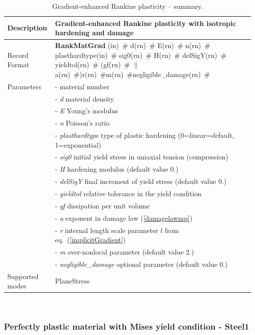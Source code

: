 \documentclass[a4paper]{article}
\newcommand{\descitem}[1]{{\noindent \bf #1}}
\newcommand{\elemparam}[2]{{{#1\tiny (#2)}~\#}}
\newcommand{\param}[1]{{\it #1}}
\newenvironment{mmt}{\begin{tabular}{|l|p{9cm}|}}{\end{tabular}\\}
\newenvironment{mmt}{\begin{tabular}{|l|l|}}{\end{tabular}\\}
\begin{document}
\begin{table}[!htb]
\begin{mmt}
\hline
Description & Gradient-enhanced Rankine plasticity with isotropic hardening and damage\\
\hline
Record Format & \descitem{RankMatGrad}  \elemparam{}{in}
\elemparam{d}{rn} \elemparam{E}{rn} \elemparam{n}{rn} \elemparam{plasthardtype}{in} \elemparam{sig0}{rn} \elemparam{H}{rn} \elemparam{delSigY}{rn} \elemparam{yieldtol}{rn} (\elemparam{gf}{rn} $\|$ \elemparam{a}{rn})\elemparam{r}{rn}\elemparam{m}{rn}\elemparam{negligible\_damage}{rn}\\
Parameters &- \param{} material number\\
&- \param{d} material density\\
&- \param{E} Young's modulus\\
&- \param{n} Poisson's ratio\\
&- \param{plasthardtype} type of plastic hardening (0=linear=default, 1=exponential)\\
&- \param{sig0} initial yield stress in uniaxial tension (compression)\\
&- \param{H} hardening modulus (default value 0.)\\
&- \param{delSigY} final increment of yield stress (default value 0.)\\
&- \param{yieldtol} relative tolerance in the yield condition\\
&- \param{gf} dissipation per unit volume\\
&- \param{a} exponent in damage law (\ref{damagelawmp})\\
&- \param{r} internal length scale parameter $l$ from eq.~(\ref{implicitGradient})\\
&- \param{m} over-nonlocal parameter (default value 2.)\\
&- \param{negligible\_damage} optional parameter (default value 0.)\\
Supported modes& PlaneStress\\
\hline
\end{mmt}
\caption{Gradient-enhanced Rankine plasticity -- summary.}
\label{rankineMatGrad_table}
\end{table}

\subsubsection{Perfectly plastic material with Mises yield condition - Steel1}
\end{document}
